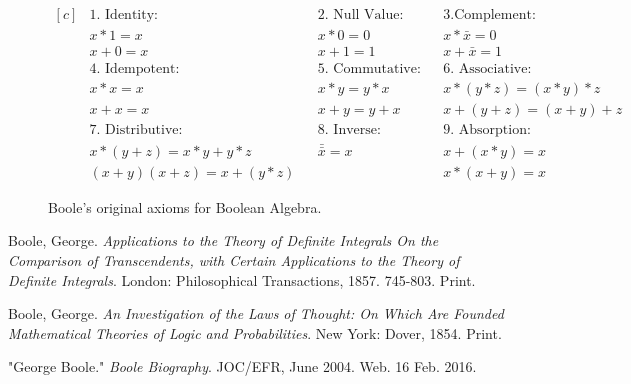 \documentclass[12]{article} %
\begin{document}
\begin{figure}[H]
\begin{equation*}
\begin{aligned}[c]
&1.\text{ Identity:}		&	&2.\text{ Null Value:}		&	&3.\text{Complement:}\\
&x*1 = x				&	&x*0 = 0				&	&x*\bar{x} = 0\\
&x + 0 = x				&	&x + 1 = 1				&	&x + \bar{x} = 1\\
&4.\text{ Idempotent:}	&	&5.\text{ Commutative:}	&	&6.\text{ Associative:}\\
&x*x = x				&	&x*y = y*x				&	&x*(y*z) = (x*y)*z\\
&x + x = x				&	&x + y = y + x			&	&x+(y+z) = (x+y)+z\\
&7.\text{ Distributive:}	&	&8.\text{ Inverse:}		&	&9.\text{ Absorption:}\\
&x*(y+z) = x*y + y*z		&	&\bar{\bar{x}} = x		&	&x+(x*y) = x\\
&(x+y)(x+z) = x + (y*z)	&	&					&	&x*(x+y) = x
\end{aligned}
\end{equation*}
\caption{Boole's original axioms for Boolean Algebra.}\label{fig4}
\end{figure}

\newpage

\begin{thebibliography}{9}
Boole, George. 
\textit{Applications to the Theory of Definite Integrals On the Comparison of Transcendents, with Certain Applications to the Theory of Definite Integrals}. 
London: Philosophical Transactions, 1857. 745-803. Print.
 
Boole, George. 
\textit{An Investigation of the Laws of Thought: On Which Are Founded Mathematical Theories of Logic and Probabilities}.
New York: Dover, 1854. Print.
 
"George Boole."
\textit{Boole Biography}.
JOC/EFR, June 2004. Web. 16 Feb. 2016. 
\end{thebibliography}
\end{document}
